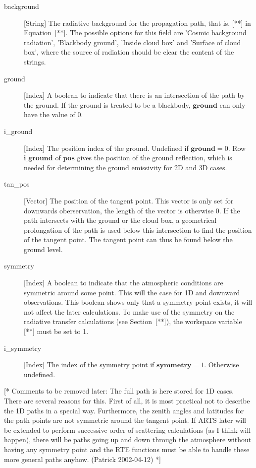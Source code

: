 \begin{description}
   \item[background] [String] The radiative background for the
     propagation path, that is, [**] in Equation~[**]. The possible
     options for this field are 'Cosmic background radiation',
     'Blackbody ground', 'Inside cloud box' and 'Surface of cloud
     box', where the source of radiation should be clear the content
     of the strings.

  \item[ground] [Index] A boolean to indicate that there is an intersection
     of the path by the ground. If the ground is treated to be a blackbody,
     $\mathbf{ground}$ can only have the value of 0.
     
   \item[i\_ground] [Index] The position index of the ground.
     Undefined if $\mathbf{ground}=0$. Row $\mathbf{i\_ground}$ of
     $\mathbf{pos}$ gives the position of the ground reflection, which
     is needed for determining the ground emissivity for 2D and 3D cases.

  \item[tan\_pos] [Vector] The position of the tangent point. This vector is
      only set for downwards oberservation, the length of the vector is
      otherwise 0. If the path intersects with the ground or the cloud box,
      a geometrical prolongation of the path is used below this intersection
      to find the position of the tangent point. The tangent point can thus
      be found below the ground level.
     
   \item[symmetry] [Index] A boolean to indicate that the atmospheric
     conditions are symmetric around some point. This will the case
     for 1D and downward observations. This boolean shows only that a
     symmetry point exists, it will not affect the later calculations.
     To make use of the symmetry on the radiative transfer
     calculations (see Section~[**]), the workspace variable [**] must
     be set to 1.

   \item[i\_symmetry] [Index] The index of the symmetry point if 
     $\mathbf{symmetry}=1$. Otherwise undefined.

\end{description}

[* Comments to be removed later: The full path is here stored for 1D
cases.  There are several reasons for this. First of all, it is most
practical not to describe the 1D paths in a special way. Furthermore,
the zenith angles and latitudes for the path points are not symmetric
around the tangent point. If ARTS later will be extended to perform
successive order of scattering calculations (as I think will happen),
there will be paths going up and down through the atmosphere without
having any symmetry point and the RTE functions must be able to handle
these more general paths anyhow. (Patrick 2002-04-12) *]



